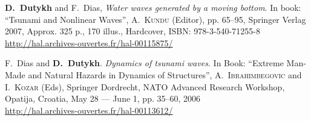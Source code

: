 \begin{etaremune}
  
    
    \item \textbf{D.~Dutykh} and F.~Dias, \textit{Water waves generated by a moving bottom}. In book: ``Tsunami and Nonlinear Waves'', A.~\textsc{Kundu} (Editor), pp. 65--95, Springer Verlag 2007, Approx. 325 p., 170 illus., Hardcover, ISBN: 978-3-540-71255-8 \\ %
    \url{http://hal.archives-ouvertes.fr/hal-00115875/}
    
  
    
    \item F.~Dias and \textbf{D.~Dutykh}. \textit{Dynamics of tsunami waves}. In Book: ``Extreme Man-Made and Natural Hazards in Dynamics of Structures'', A.~\textsc{Ibrahimbegovic} and I.~\textsc{Kozar} (Eds), Springer Dordrecht, NATO Advanced Research Workshop, Opatija, Croatia, May 28 --- June 1, pp. 35--60, 2006 \\ %
    \url{http://hal.archives-ouvertes.fr/hal-00113612/}
    
  \end{etaremune}